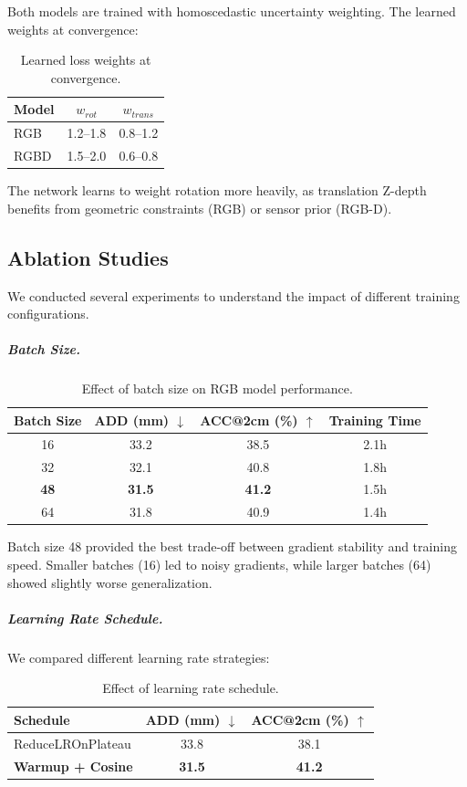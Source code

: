 Both models are trained with homoscedastic uncertainty weighting. The learned weights at convergence:

\begin{table}[h]
\centering
\caption{Learned loss weights at convergence.}
\label{tab:learned_weights}
\begin{tabular}{lcc}
\toprule
Model & $w_{rot}$ & $w_{trans}$ \\
\midrule
RGB & 1.2--1.8 & 0.8--1.2 \\
RGBD & 1.5--2.0 & 0.6--0.8 \\
\bottomrule
\end{tabular}
\end{table}

The network learns to weight rotation more heavily, as translation Z-depth benefits from geometric constraints (RGB) or sensor prior (RGB-D).

\subsection{Ablation Studies}

We conducted several experiments to understand the impact of different training configurations.

\subparagraph{Batch Size.}

\begin{table}[h]
\centering
\caption{Effect of batch size on RGB model performance.}
\label{tab:ablation_batch}
\scriptsize
\begin{tabular}{c|cc|c}
\toprule
Batch Size & ADD (mm) $\downarrow$ & ACC@2cm (\%) $\uparrow$ & Training Time \\
\midrule
16 & 33.2 & 38.5 & 2.1h \\
32 & 32.1 & 40.8 & 1.8h \\
\textbf{48} & \textbf{31.5} & \textbf{41.2} & 1.5h \\
64 & 31.8 & 40.9 & 1.4h \\
\bottomrule
\end{tabular}
\end{table}

Batch size 48 provided the best trade-off between gradient stability and training speed. Smaller batches (16) led to noisy gradients, while larger batches (64) showed slightly worse generalization.

\subparagraph{Learning Rate Schedule.}

We compared different learning rate strategies:

\begin{table}[h]
\centering
\caption{Effect of learning rate schedule.}
\label{tab:ablation_lr}
\begin{tabular}{l|cc}
\toprule
Schedule & ADD (mm) $\downarrow$ & ACC@2cm (\%) $\uparrow$ \\
\midrule
ReduceLROnPlateau & 33.8 & 38.1 \\
\textbf{Warmup + Cosine} & \textbf{31.5} & \textbf{41.2} \\
\bottomrule
\end{tabular}
\end{table}

